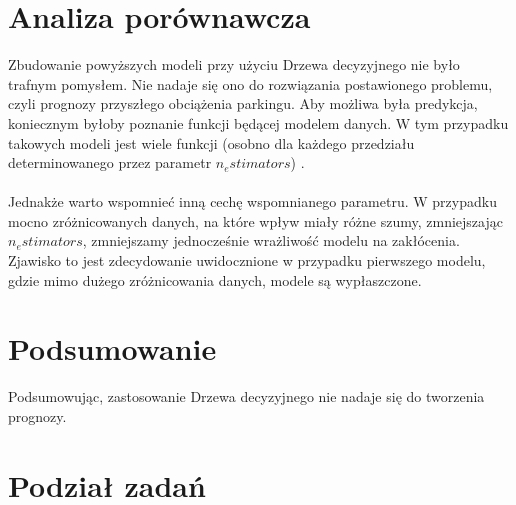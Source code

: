 \documentclass[]{article}
\begin{document}
\section{Analiza porównawcza}
Zbudowanie powyższych modeli przy użyciu Drzewa decyzyjnego nie było trafnym pomysłem. Nie nadaje się ono do rozwiązania postawionego problemu, czyli prognozy przyszłego obciążenia parkingu. Aby możliwa była predykcja, koniecznym byłoby poznanie funkcji będącej modelem danych. W tym przypadku takowych modeli jest wiele funkcji (osobno dla każdego przedziału determinowanego przez parametr $n_estimators$) .\\
\\
Jednakże warto wspomnieć inną cechę wspomnianego parametru. W przypadku mocno zróżnicowanych danych, na które wpływ miały różne szumy, zmniejszając $n_estimators$, zmniejszamy jednocześnie wrażliwość modelu na zakłócenia. Zjawisko to jest zdecydowanie uwidocznione w przypadku pierwszego modelu, gdzie mimo dużego zróżnicowania danych, modele są wypłaszczone.

\section{Podsumowanie}
Podsumowując, zastosowanie Drzewa decyzyjnego nie nadaje się do tworzenia prognozy.


\section{Podział zadań}
\end{document}
